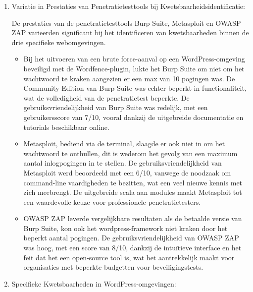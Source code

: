 \begin{enumerate}
  \item Variatie in Prestaties van Penetratietesttools bij Kwetsbaarheidsidentificatie:
  
  De prestaties van de penetratietesttools Burp Suite, Metasploit en OWASP ZAP varieerden significant bij het identificeren 
  van kwetsbaarheden binnen de drie specifieke webomgevingen.
  \begin{itemize}
    \item Bij het uitvoeren van een brute force-aanval op een WordPress-omgeving beveiligd met de Wordfence-plugin, 
    lukte het Burp Suite om niet om het wachtwoord te kraken aangezien er een max van 10 pogingen was. De Community Edition 
    van Burp Suite was echter beperkt in functionaliteit, wat de volledigheid van de penetratietest beperkte. De 
    gebruiksvriendelijkheid van Burp Suite was redelijk, met een gebruikersscore van 7/10, vooral dankzij de uitgebreide 
    documentatie en tutorials beschikbaar online.
    \item Metasploit, bediend via de terminal, slaagde er ook niet in om het wachtwoord te onthullen, dit is wederom het 
    gevolg van een maximum aantal inlogpogingen in te stellen. De gebruiksvriendelijkheid van Metasploit werd beoordeeld 
    met een 6/10, vanwege de noodzaak om command-line vaardigheden te bezitten, wat een veel nieuwe kennis met zich meebrengt. 
    De uitgebreide scala aan modules maakt Metasploit tot een waardevolle keuze voor professionele penetratietesters.
    \item OWASP ZAP leverde vergelijkbare resultaten als de betaalde versie van Burp Suite, kon ook het wordpress-framework 
    niet kraken door het beperkt aantal pogingen. De gebruiksvriendelijkheid van OWASP ZAP was hoog, met een score van 8/10, 
    dankzij de intuïtieve interface en het feit dat het een open-source tool is, wat het aantrekkelijk maakt voor 
    organisaties met beperkte budgetten voor beveiligingstests.
  \end{itemize}
  \item Specifieke Kwetsbaarheden in WordPress-omgevingen:
  

\end{enumerate}
